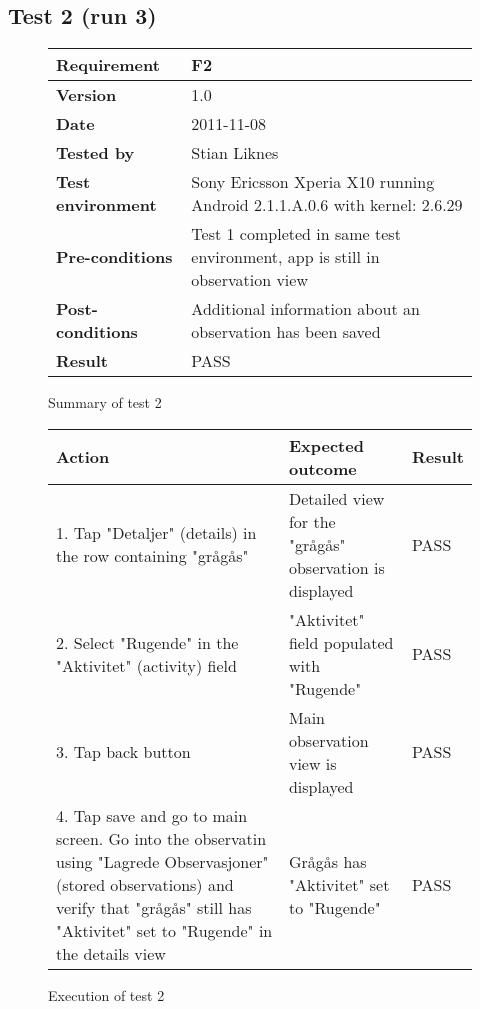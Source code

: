 \newpage
\subsection{Test 2 (run 3)}

	\begin{figure}[htb]
		\centering
		\begin{tabular}{|p{3.5cm}|p{7.0cm}|} \hline
			\textbf{Requirement} & F2 \\ \hline
			\textbf{Version} & 1.0 \\ \hline
			\textbf{Date} & 2011-11-08 \\ \hline
			\textbf{Tested by} & Stian Liknes \\ \hline
			\textbf{Test environment} & Sony Ericsson Xperia X10 running Android 2.1.1.A.0.6 with kernel: 2.6.29 \\ \hline
			\textbf{Pre-conditions} & Test 1 completed in same test environment, app is still in observation view \\ \hline
			\textbf{Post-conditions} & Additional information about an observation has been saved \\ \hline
			\textbf{Result} & PASS \\ \hline
		\end{tabular}
		\caption{Summary of test 2}
	\end{figure}

	\begin{figure}[htb]
		\centering

		\begin{tabular}{|p{5.0cm}|p{5.0cm}|p{1cm}|}
			\hline \textbf{Action} & \textbf{Expected outcome} & \textbf{Result} \\ \hline

			1. Tap "Detaljer" (details) in the row containing "grågås" &
			Detailed view for the "grågås" observation is displayed & 
			PASS \\ \hline

			2. Select "Rugende" in the "Aktivitet" (activity) field &
			"Aktivitet" field populated with "Rugende" &
			PASS \\ \hline

			3. Tap back button & 
			Main observation view is displayed & 
			PASS \\ \hline

			4. Tap save and go to main screen. Go into the observatin using
			"Lagrede Observasjoner" (stored observations) and verify that "grågås"
			still has "Aktivitet" set to "Rugende" in the details view &
			Grågås has "Aktivitet" set to "Rugende" &
			PASS \\ \hline
		\end{tabular}
		\caption{Execution of test 2}
	\end{figure}

